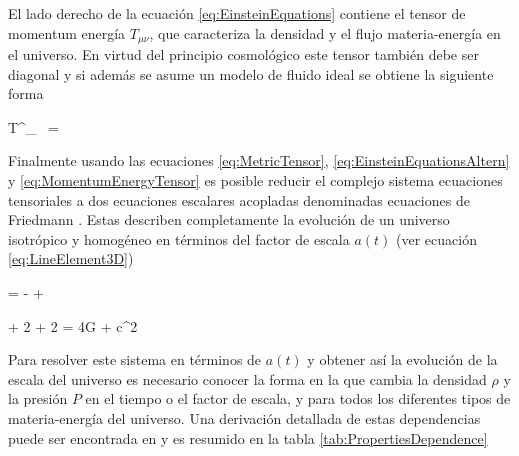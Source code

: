 El lado derecho de la ecuación \ref{eq:EinsteinEquations} contiene el 
tensor de momentum energía $T_{\mu \nu}$, que caracteriza la densidad y el 
flujo materia-energía en el universo. En virtud del principio cosmológico
este tensor también debe ser diagonal y si además se asume un modelo de 
fluido ideal se obtiene la siguiente forma


{T^\mu_{\ \nu} = }


Finalmente usando las ecuaciones \ref{eq:MetricTensor}, 
\ref{eq:EinsteinEquationsAltern} y \ref{eq:MomentumEnergyTensor} es posible 
reducir el complejo sistema ecuaciones tensoriales a dos ecuaciones 
escalares acopladas denominadas ecuaciones de Friedmann \cite{longair2008}. 
Estas describen completamente la evolución de un universo isotrópico y 
homogéneo en términos del factor de escala $a(t)$ (ver ecuación
\ref{eq:LineElement3D})


{  = -
+ }


{  + 2 + 2 =
4\pi G  + c^2 \Lambda}


Para resolver este sistema en términos de $a(t)$ y obtener así la evolución 
de la escala del universo es necesario conocer la forma en la que cambia la 
densidad $\rho$ y la presión $P$ en el tiempo o el factor de escala, y para 
todos los diferentes tipos de materia-energía del universo. Una derivación 
detallada de estas dependencias puede ser encontrada en \cite{longair2008} y
es resumido en la tabla \ref{tab:PropertiesDependence}

